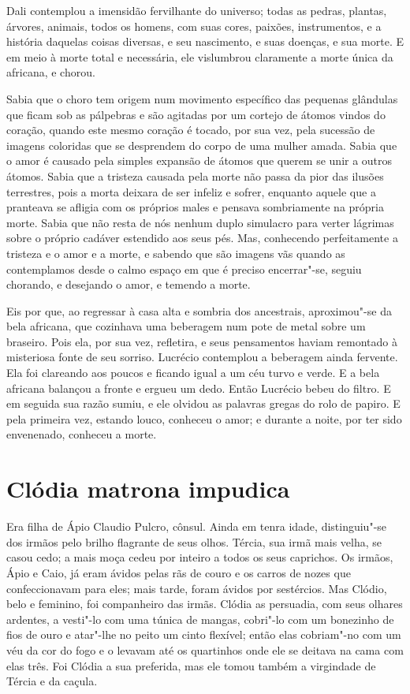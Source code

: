 Dali contemplou a imensidão fervilhante do universo; todas as pedras,
plantas, árvores, animais, todos os homens, com suas cores, paixões,
instrumentos, e a história daquelas coisas diversas, e seu nascimento, e
suas doenças, e sua morte. E em meio à morte total e necessária, ele
vislumbrou claramente a morte única da africana, e chorou.

Sabia que o choro tem origem num movimento específico das pequenas
glândulas que ficam sob as pálpebras e são agitadas por um cortejo de
átomos vindos do coração, quando este mesmo coração é tocado, por sua vez,
pela sucessão de imagens coloridas que se desprendem do corpo de uma
mulher amada. Sabia que o amor é causado pela simples expansão de átomos
que querem se unir a outros átomos. Sabia que a tristeza causada pela
morte não passa da pior das ilusões terrestres, pois a morta deixara de
ser infeliz e sofrer, enquanto aquele que a pranteava se afligia com os
próprios males e pensava sombriamente na própria morte. Sabia que não
resta de nós nenhum duplo simulacro para verter lágrimas sobre o próprio
cadáver estendido aos seus pés. Mas, conhecendo perfeitamente a tristeza e
o amor e a morte, e sabendo que são imagens vãs quando as contemplamos
desde o calmo espaço em que é preciso encerrar"-se, seguiu chorando, e
desejando o amor, e temendo a morte.

Eis por que, ao regressar à casa alta e sombria dos ancestrais,
aproximou"-se da bela africana, que cozinhava uma beberagem num pote de
metal sobre um braseiro. Pois ela, por sua vez, refletira, e seus
pensamentos haviam remontado à misteriosa fonte de seu sorriso. Lucrécio
contemplou a beberagem ainda fervente. Ela foi clareando aos poucos e
ficando igual a um céu turvo e verde. E a bela africana balançou a fronte
e ergueu um dedo. Então Lucrécio bebeu do filtro. E em seguida sua razão
sumiu, e ele olvidou as palavras gregas do rolo de papiro. E pela primeira
vez, estando louco, conheceu o amor; e durante a noite, por ter sido
envenenado, conheceu a morte.

\chapter{Clódia matrona impudica}

Era filha de Ápio Claudio Pulcro, cônsul. Ainda em tenra idade,
distinguiu"-se dos irmãos pelo brilho flagrante de seus olhos. Tércia, sua
irmã mais velha, se casou cedo; a mais moça cedeu por inteiro a todos os
seus caprichos. Os irmãos, Ápio e Caio, já eram ávidos pelas rãs de couro
e os carros de nozes que confeccionavam para eles; mais tarde, foram
ávidos por sestércios. Mas Clódio, belo e feminino, foi companheiro das
irmãs. Clódia as persuadia, com seus olhares ardentes, a vesti"-lo com uma
túnica de mangas, cobri"-lo com um bonezinho de fios de ouro e atar"-lhe no
peito um cinto flexível; então elas cobriam"-no com um véu da cor do fogo e
o levavam até os quartinhos onde ele se deitava na cama com elas três. Foi
Clódia a sua preferida, mas ele tomou também a virgindade de Tércia e da
caçula.

